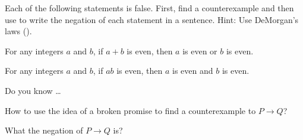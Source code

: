 \begin{exer}[\exerU] %
\label{exer_negation_ifthen_even}
    Each of the following statements is false.  First, find a counterexample and then use   to write the negation of each statement in a sentence.  Hint: Use DeMorgan's laws ().
        \begin{exerpart}
            \item For any integers $a$ and $b$, if $a+b$ is even, then $a$ is even or $b$ is even.
            \item For any integers $a$ and $b$, if $ab$ is even, then $a$ is even and $b$ is even.
        \end{exerpart}
\end{exer}



\begin{exer}[\exerR] %
\label{exer_dyk_neg_conditional}
    Do you know \ldots
        \begin{exerpart}
            \item How to use the idea of a broken promise to find a counterexample to $P \to Q$?
            \item What the negation of $P \to Q$ is?
        \end{exerpart}
\end{exer}


